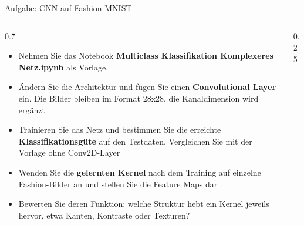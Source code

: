 \begin{frame}{Aufgabe: CNN auf Fashion-MNIST}
\footnotesize
\begin{columns}
\begin{column}{0.7\linewidth}
\begin{itemize}
  \item Nehmen Sie das Notebook \textbf{Multiclass Klassifikation Komplexeres Netz.ipynb} als Vorlage.
  \item Ändern Sie die Architektur und fügen Sie einen \textbf{Convolutional Layer} ein. Die Bilder bleiben im Format 28x28, die Kanaldimension wird ergänzt
  \item Trainieren Sie das Netz und bestimmen Sie die erreichte \textbf{Klassifikationsgüte} auf den Testdaten. Vergleichen Sie mit der Vorlage ohne Conv2D-Layer
  \item Wenden Sie die \textbf{gelernten Kernel} nach dem Training auf einzelne Fashion-Bilder an und stellen Sie die Feature Maps dar
  \item Bewerten Sie deren Funktion: welche Struktur hebt ein Kernel jeweils hervor, etwa Kanten, Kontraste oder Texturen?
\end{itemize}
\end{column}
\begin{column}{0.25\linewidth}
\begin{center}
\end{center}
\end{column}

\end{columns}
\end{frame}



